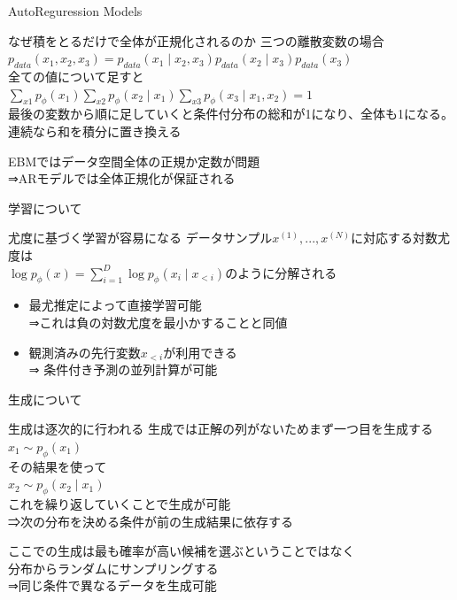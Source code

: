 \begin{frame}{AutoReguression Models}
    \begin{alertblock}{なぜ積をとるだけで全体が正規化されるのか}
        三つの離散変数の場合\\
        $p_{data}(x_1,x_2,x_3)=p_{data}(x_1\mid x_2,x_3)p_{data}(x_2\mid x_3)p_{data}(x_3)$\\
        全ての値について足すと\\
        $\sum_{x1}p_{\phi}(x_{1})\sum_{x2}p_{\phi}(x_{2}\mid x_{1})\sum_{x3}p_{\phi}(x_{3}\mid x_{1},x_{2})=1$\\
        最後の変数から順に足していくと条件付分布の総和が1になり、全体も1になる。連続なら和を積分に置き換える\\
    \end{alertblock}
    EBMではデータ空間全体の正規か定数が問題\\
    ⇒ARモデルでは全体正規化が保証される
\end{frame}
\begin{frame}{学習について}
    \begin{block}{尤度に基づく学習が容易になる}
    データサンプル$\mathit{x}^{(1)},...,\mathit{x}^{(N)}$に対応する対数尤度は\\
    $\log p_{\phi}(\mathit{x})=\sum_{i=1}^{D}\log p_{\phi}(\mathit{x}_i\mid\mathit{x}_{<i})$のように分解される\\
    \vspace{1em}
    \begin{itemize}
    \item 最尤推定によって直接学習可能\\
    ⇒これは負の対数尤度を最小かすることと同値\\
    \vspace{1em}
    \item 観測済みの先行変数$x_{<i}$が利用できる\\⇒
    条件付き予測の並列計算が可能
    \end{itemize}
    \end{block}


\end{frame}
\begin{frame}{生成について}
    \begin{block}{生成は逐次的に行われる}
    生成では正解の列がないためまず一つ目を生成する\\
    $x_1 \sim p_{\phi}(x_1)$\\
    その結果を使って\\
    $x_2 \sim p_{\phi}(x_2\mid x_1)$\\
    これを繰り返していくことで生成が可能\\
    ⇒次の分布を決める条件が前の生成結果に依存する
    \end{block}
    ここでの生成は最も確率が高い候補を選ぶということではなく\\
    分布からランダムにサンプリングする\\
    ⇒同じ条件で異なるデータを生成可能
\end{frame}
